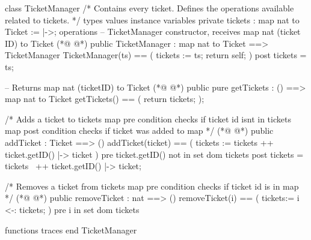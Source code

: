 \begin{vdmpp}[breaklines=true]
class TicketManager
/*
  Contains every ticket.
  Defines the operations available related to tickets.
*/
types
values
instance variables
 private tickets : map nat to Ticket := {|->};
operations
 -- TicketManager constructor, receives map nat (ticket ID) to Ticket
(*@
\label{TicketManager:12}
@*)
 public TicketManager : map nat to Ticket ==> TicketManager
  TicketManager(ts) == (
   tickets := ts;
   return self;
  )
 post tickets = ts;
  
 -- Returns map nat (ticketID) to Ticket
(*@
\label{getTickets:20}
@*)
 public pure getTickets : () ==> map nat to Ticket
 getTickets() == (
  return tickets;
 );
 
 /*
  Adds a ticket to tickets map
  pre condition checks if ticket id isnt in tickets map
  post condition checks if ticket was added to map
 */ 
(*@
\label{addTicket:30}
@*)
 public addTicket : Ticket ==> ()
 addTicket(ticket) == (
  tickets := tickets ++ {ticket.getID() |-> ticket}
 )
 pre ticket.getID() not in set dom tickets
 post tickets = tickets~ ++ {ticket.getID() |-> ticket};
 
 /*
  Removes a ticket from tickets map
  pre condition checks if ticket id is in map
 */
(*@
\label{removeTicket:41}
@*)
 public removeTicket : nat ==> ()
 removeTicket(i) == (
  tickets:= {i} <-: tickets; 
 )
 pre i in set dom tickets
 
functions
traces
end TicketManager
\end{vdmpp}
